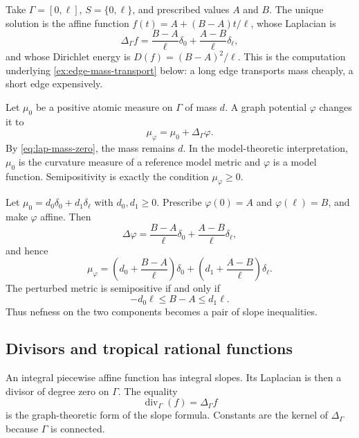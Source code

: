 \begin{example}
\label{ex:ch08-segment-dirichlet}
Take $\Gamma=[0,\ell]$, $S=\{0,\ell\}$, and prescribed values $A$ and $B$.
The unique solution is the affine function
$f(t)=A+(B-A)t/\ell$, whose Laplacian is
\[
 \Delta_\Gamma f=\frac{B-A}{\ell}\delta_0+\frac{A-B}{\ell}\delta_\ell ,
\]
and whose Dirichlet energy is $D(f)=(B-A)^2/\ell$.  This is the computation
underlying \cref{ex:edge-mass-transport} below: a long edge transports mass
cheaply, a short edge expensively.
\end{example}

Let $\mu_0$ be a positive atomic measure on $\Gamma$ of mass $d$.  A graph
potential $\varphi$ changes it to
\begin{equation}
\label{eq:graph-curvature}
                         \mu_\varphi=\mu_0+\Delta_\Gamma\varphi.
\end{equation}
By \eqref{eq:lap-mass-zero}, the mass remains $d$.  In the model-theoretic
interpretation, $\mu_0$ is the curvature measure of a reference model metric
and $\varphi$ is a model function.  Semipositivity is exactly the condition
$\mu_\varphi\geq0$.

\begin{example}
\label{ex:edge-mass-transport}
Let $\mu_0=d_0\delta_0+d_1\delta_\ell$ with $d_0,d_1\geq0$.  Prescribe
$\varphi(0)=A$ and $\varphi(\ell)=B$, and make $\varphi$ affine.  Then
\[
 \Delta\varphi=
 \frac{B-A}{\ell}\delta_0+
 \frac{A-B}{\ell}\delta_\ell,
\]
and hence
\[
 \mu_\varphi=
 \left(d_0+\frac{B-A}{\ell}\right)\delta_0+
 \left(d_1+\frac{A-B}{\ell}\right)\delta_\ell.
\]
The perturbed metric is semipositive if and only if
\[
                         -d_0\ell\leq B-A\leq d_1\ell.
\]
Thus nefness on the two components becomes a pair of slope inequalities.
\end{example}

\subsection{Divisors and tropical rational functions}
\label{sec:ch08-tropical-rational}

An integral piecewise affine function has integral slopes.  Its Laplacian is
then a divisor of degree zero on $\Gamma$.  The equality
\[
                         \operatorname{div}_\Gamma(f)=\Delta_\Gamma f
\]
is the graph-theoretic form of the slope formula.  Constants are the kernel
of $\Delta_\Gamma$ because $\Gamma$ is connected.

